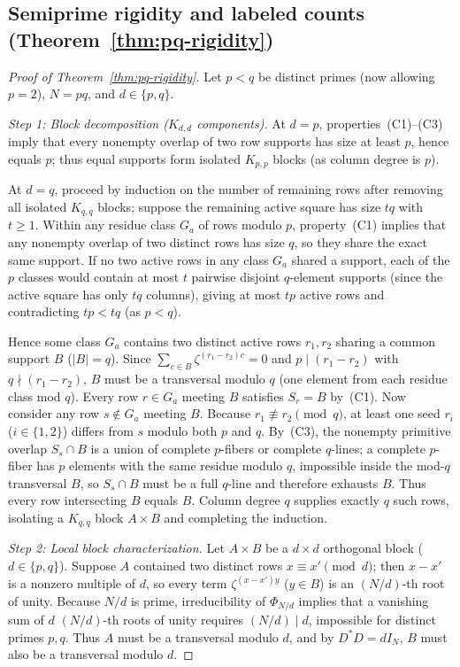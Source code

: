 \documentclass[11pt,reqno]{amsart}
\numberwithin{equation}{section}
\theoremstyle{definition}
\theoremstyle{remark}
\begin{document}
\subsection{Semiprime rigidity and labeled counts (Theorem~\ref{thm:pq-rigidity})}

\begin{proof}[Proof of Theorem~\ref{thm:pq-rigidity}]
Let $p<q$ be distinct primes (now allowing $p=2$), $N=pq$, and $d\in\{p,q\}$.

\smallskip
\noindent\emph{Step 1: Block decomposition ($K_{d,d}$ components).}
At $d=p$, properties~(C1)--(C3) imply that every nonempty overlap of two row supports has size at least $p$, hence equals $p$; thus equal supports form isolated $K_{p,p}$ blocks (as column degree is $p$).

At $d=q$, proceed by induction on the number of remaining rows after removing all isolated $K_{q,q}$ blocks; suppose the remaining active square has size $tq$ with $t\ge 1$. Within any residue class $G_a$ of rows modulo $p$, property~(C1) implies that any nonempty overlap of two distinct rows has size $q$, so they share the exact same support. If no two active rows in any class $G_a$ shared a support, each of the $p$ classes would contain at most $t$ pairwise disjoint $q$-element supports (since the active square has only $tq$ columns), giving at most $tp$ active rows and contradicting $tp<tq$ (as $p<q$).

Hence some class $G_a$ contains two distinct active rows $r_1,r_2$ sharing a common support $B$ ($|B|=q$). Since $\sum_{c\in B}\zeta^{(r_1-r_2)c}=0$ and $p\mid (r_1-r_2)$ with $q\nmid (r_1-r_2)$, $B$ must be a transversal modulo $q$ (one element from each residue class mod $q$). Every row $r\in G_a$ meeting $B$ satisfies $S_r=B$ by~(C1). Now consider any row $s\notin G_a$ meeting $B$. Because $r_1\not\equiv r_2\pmod q$, at least one seed $r_i$ ($i\in\{1,2\}$) differs from $s$ modulo both $p$ and $q$. By~(C3), the nonempty primitive overlap $S_s\cap B$ is a union of complete $p$-fibers or complete $q$-lines; a complete $p$-fiber has $p$ elements with the same residue modulo $q$, impossible inside the mod-$q$ transversal $B$, so $S_s\cap B$ must be a full $q$-line and therefore exhausts $B$. Thus every row intersecting $B$ equals $B$. Column degree $q$ supplies exactly $q$ such rows, isolating a $K_{q,q}$ block $A\times B$ and completing the induction.

\smallskip
\noindent\emph{Step 2: Local block characterization.}
Let $A\times B$ be a $d\times d$ orthogonal block ($d\in\{p,q\}$). Suppose $A$ contained two distinct rows $x\equiv x'\pmod d$; then $x-x'$ is a nonzero multiple of $d$, so every term $\zeta^{(x-x')y}$ ($y\in B$) is an $(N/d)$-th root of unity. Because $N/d$ is prime, irreducibility of $\Phi_{N/d}$ implies that a vanishing sum of $d$ $(N/d)$-th roots of unity requires $(N/d)\mid d$, impossible for distinct primes $p,q$. Thus $A$ must be a transversal modulo $d$, and by $D^*D=dI_N$, $B$ must also be a transversal modulo $d$.


\end{proof}
\end{document}
